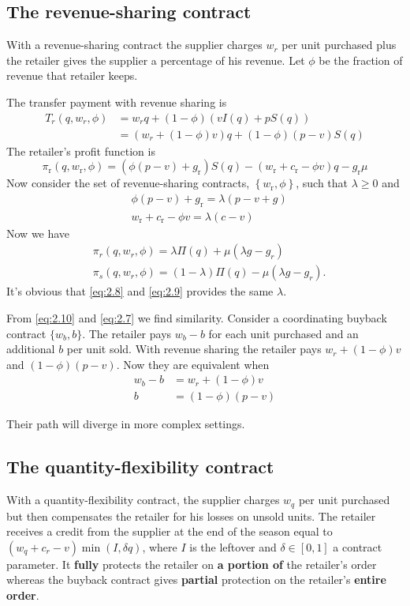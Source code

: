 \subsection{The revenue-sharing contract}
With a revenue-sharing contract the supplier charges $w_r$ per unit purchased plus the retailer gives the supplier a percentage of his revenue. Let $\phi$ be the fraction of revenue that retailer keeps.

The transfer payment with revenue sharing is 
\begin{align*}
    T_r(q,w_r,\phi)&=w_r q+(1-\phi)(vI(q)+pS(q))\\
    &=(w_r+(1-\phi)v)q+(1-\phi)(p-v)S(q)
\end{align*}
The retailer's profit function is
$$
\pi_{\mathrm{r}}\left(q, w_{\mathrm{r}}, \phi\right)=\left(\phi(p-v)+g_{\mathrm{r}}\right) S(q)-\left(w_{\mathrm{r}}+c_{\mathrm{r}}-\phi v\right) q-g_{\mathrm{r}} \mu
$$
Now consider the set of revenue-sharing contracts, $\left\{w_{\mathrm{r}}, \phi\right\}$, such that $\lambda \geq 0$ and
$$
\begin{aligned}
&\phi(p-v)+g_{\mathrm{r}}=\lambda(p-v+g) \\
&w_{\mathrm{r}}+c_{\mathrm{r}}-\phi v=\lambda(c-v)
\end{aligned}
$$
Now we have 
\begin{align}
    &\pi_r(q,w_r,\phi)=\lambda\Pi(q)+\mu(\lambda g - g_r)\label{eq:2.10}\\
    &\pi_s(q,w_r,\phi)=(1-\lambda)\Pi(q)-\mu(\lambda g-g_r)\nonumber.
\end{align}
It's obvious that \autoref{eq:2.8} and \autoref{eq:2.9} provides the same $\lambda$.

From \autoref{eq:2.10} and \autoref{eq:2.7} we find similarity. Consider a coordinating buyback contract $\{w_b,b\}$. The retailer pays $w_b-b$ for each unit purchased and an additional $b$ per unit sold. With revenue sharing the retailer pays $w_r+(1-\phi)v$ and $(1-\phi)(p-v)$.  Now they are equivalent when 
\begin{align*}
    w_b-b&=w_r+(1-\phi)v\\
    b&=(1-\phi)(p-v)
\end{align*}
\begin{note}
    Their path will diverge in more complex settings.
\end{note}

\subsection{The quantity-flexibility contract}
With a quantity-flexibility contract, the supplier charges $w_q$ per unit purchased but then compensates the retailer for his losses on unsold units. The retailer receives a credit from the supplier at the end of the season equal to $(w_q+c_r-v)\min(I,\delta q)$, where $I$ is the leftover and $\delta\in[0,1]$ a contract parameter. It \textbf{fully} protects the retailer on \textbf{a portion of} the retailer's order whereas the buyback contract gives \textbf{partial} protection on the retailer's \textbf{entire order}. 

